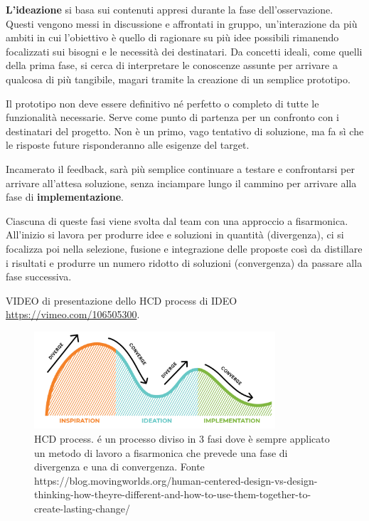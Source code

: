 \textbf{L'ideazione} si basa sui contenuti appresi durante la fase dell'osservazione. Questi vengono messi in discussione e affrontati in gruppo, un'interazione da più ambiti in cui l'obiettivo è quello di ragionare su più idee possibili rimanendo focalizzati sui bisogni e le necessità dei destinatari. Da concetti ideali, come quelli della prima fase, si cerca di interpretare le conoscenze assunte per arrivare a qualcosa di più tangibile, magari tramite la creazione di un semplice prototipo. 

Il prototipo non deve essere definitivo né perfetto o completo di tutte le funzionalità necessarie. Serve come punto di partenza per un confronto con i destinatari del progetto. Non è un primo, vago tentativo di soluzione, ma fa sì che le risposte future risponderanno alle esigenze del target.

Incamerato il feedback, sarà più semplice continuare a testare e confrontarsi per arrivare all'attesa soluzione, senza inciampare lungo il cammino per arrivare alla fase di \textbf{implementazione}.

Ciascuna di queste fasi viene svolta dal team con una approccio a fisarmonica. All'inizio si lavora per produrre idee e soluzioni in quantità (divergenza), ci si focalizza poi nella selezione, fusione e integrazione delle proposte così da distillare i risultati e produrre un numero ridotto di soluzioni (convergenza) da passare alla fase successiva.

VIDEO di presentazione dello HCD process di IDEO \url{https://vimeo.com/106505300}.

\begin{figure}[!h]
	\centering
	\includegraphics[width=0.8\textwidth]{../immagini/HCD-process.png}
	\caption{HCD process. é un processo diviso in 3 fasi dove è sempre applicato un metodo di lavoro a fisarmonica che prevede una fase di divergenza e una di convergenza. Fonte https://blog.movingworlds.org/human-centered-design-vs-design-thinking-how-theyre-different-and-how-to-use-them-together-to-create-lasting-change/} 
	\label{hcd-process}
\end{figure}

